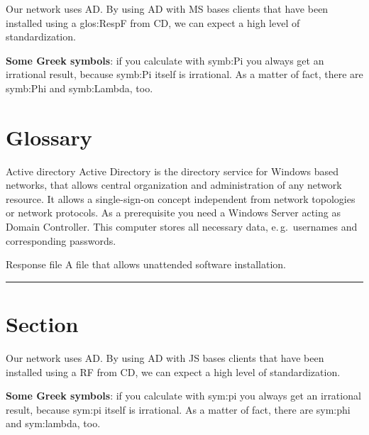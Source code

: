 \documentclass{article}
\newcommand{\gls}[1]{#1}
\newcommand{\citez}[1]{#1\protect\nocite{#1}}
\renewenvironment{glossary}
   {\begin{list}{}{\setlength\labelsep{\linewidth}%
                   \setlength\labelwidth{0pt}%
                   \setlength\itemindent{-\leftmargin}%
                   \let\makelabel\descriptionlabel}}
   {\end{list}}
\begin{document}
Our network uses \gls{AD}. By using \gls{AD} with \gls{MS} bases clients that have been installed using a \gls{glos:RespF} from \gls{CD}, we can expect a high level of standardization.

\textbf{Some Greek symbols}: if you calculate with \gls{symb:Pi} you always get an irrational result, because \gls{symb:Pi} itself is irrational. As a matter of fact, there are \gls{symb:Phi} and \gls{symb:Lambda}, too.

\section*{\textsf{Glossary}}

\begin{glossary}
   \item[Active directory] Active Directory is the directory service for Windows based networks, that allows central organization and administration of any network resource. It allows a single-sign-on concept independent from network topologies or network protocols. As a prerequisite you need a Windows Server acting as Domain Controller. This computer stores all necessary data, e.\,g.~usernames and corresponding passwords.
   \item[Response file] A file that allows unattended software installation.
\end{glossary}

{\noindent}\rule{\linewidth}{2pt}

\section{Section}

Our network uses \citez{AD}. By using \citez{AD} with \citez{JS} bases clients that have been installed using a \citez{RF} from \citez{CD}, we can expect a high level of standardization.

\textbf{Some Greek symbols}: if you calculate with \citez{sym:pi} you always get an irrational result, because \citez{sym:pi} itself is irrational. As a matter of fact, there are \citez{sym:phi} and \citez{sym:lambda}, too.



\end{document}
